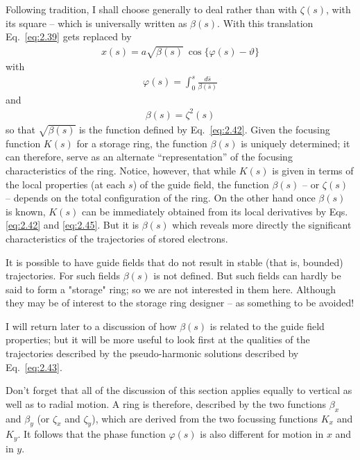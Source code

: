 Following tradition, I shall choose generally to deal rather than with $\zeta(s)$, with its square -- which is universally written as $\beta(s)$. With this translation Eq.~\eqref{eq:2.39} gets replaced by
\begin{align}
	x(s) = a\sqrt{\beta(s)}\ \cos\{\varphi(s)-\vartheta\}\label{eq:2.43}
\end{align}
with
\begin{align}
	\varphi(s) = \int_{0}^{s} \frac{d\bar{s}}{\beta(\bar{s})}\label{eq:2.44}
\end{align}
and
\begin{align}
	\beta(s) = \zeta^2(s)\label{eq:2.45}
\end{align}
so that $\sqrt{\beta(s)}$ is the function defined by Eq.~\eqref{eq:2.42}. Given the focusing function $K(s)$ for a storage ring, the function $\beta(s)$ is uniquely determined; it can therefore, serve as an alternate “representation” of the focusing characteristics of the ring. Notice, however, that while $K(s)$ is given in terms of the local properties (at each $s$) of the guide field, the function
$\beta(s)$ -- or $\zeta(s)$ -- depends on the total configuration of the ring. On the other hand once $\beta(s)$ is known, $K(s)$ can be immediately obtained from its local derivatives by Eqs. \eqref{eq:2.42} and \eqref{eq:2.45}. But it is $\beta(s)$ which reveals more directly the significant characteristics of the trajectories of stored electrons.

It is possible to have guide fields that do not result in stable (that is, bounded) trajectories. For such fields $\beta(s)$ is not defined. But such fields can hardly be said to form a "storage" ring; so we are not interested in them here. Although they may be of interest to the storage ring designer -- as something to be avoided!

I will return later to a discussion of how $\beta(s)$ is related to the guide field properties; but it will be more useful to look first at the qualities of the trajectories described by the pseudo-harmonic solutions described by Eq.~\ref{eq:2.43}. 

Don't forget that all of the discussion of this section applies equally to vertical as well as to radial motion. A ring is therefore, described by the two functions $\beta_x$ and $\beta_y$ (or $\zeta_x$ and $\zeta_y$), which are derived from the two focussing functions $K_x$ and $K_y$. It follows that the phase function $\varphi(s)$ is also different for motion in $x$ and in $y$.
